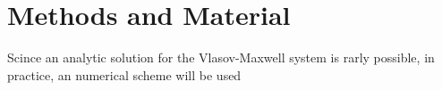 
\chapter{Methods and Material}
\label{chap:methods}

\thispagestyle{empty}

\newpage

Scince an analytic solution for the Vlasov-Maxwell system is rarly possible, in practice, an numerical scheme will be used 


\newpage